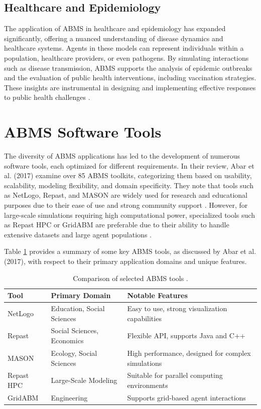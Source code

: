 \subsection{Healthcare and Epidemiology} The application of ABMS in healthcare and epidemiology has expanded significantly, offering a nuanced understanding of disease dynamics and healthcare systems. Agents in these models can represent individuals within a population, healthcare providers, or even pathogens. By simulating interactions such as disease transmission, ABMS supports the analysis of epidemic outbreaks and the evaluation of public health interventions, including vaccination strategies. These insights are instrumental in designing and implementing effective responses to public health challenges \cite{3}.

\newpage
\section{ABMS Software Tools}

The diversity of ABMS applications has led to the development of numerous software tools, each optimized for different requirements. In their review, Abar et al. (2017) examine over 85 ABMS toolkits, categorizing them based on usability, scalability, modeling flexibility, and domain specificity. They note that tools such as NetLogo, Repast, and MASON are widely used for research and educational purposes due to their ease of use and strong community support \cite{3}. However, for large-scale simulations requiring high computational power, specialized tools such as Repast HPC or GridABM are preferable due to their ability to handle extensive datasets and large agent populations \cite{3}.

Table \ref{table:abms_comparison} provides a summary of some key ABMS tools, as discussed by Abar et al. (2017), with respect to their primary application domains and unique features.

\begin{table}[h!]
\centering
\begin{tabular}{|l|l|l|}
\hline
\textbf{Tool} & \textbf{Primary Domain} & \textbf{Notable Features} \\
\hline
NetLogo & Education, Social Sciences & Easy to use, strong visualization capabilities \\
Repast & Social Sciences, Economics & Flexible API, supports Java and C++ \\
MASON & Ecology, Social Sciences & High performance, designed for complex simulations \\
Repast HPC & Large-Scale Modeling & Suitable for parallel computing environments \\
GridABM & Engineering & Supports grid-based agent interactions \\
\hline
\end{tabular}
\caption{Comparison of selected ABMS tools \cite{3}.}
\label{table:abms_comparison}
\end{table}

